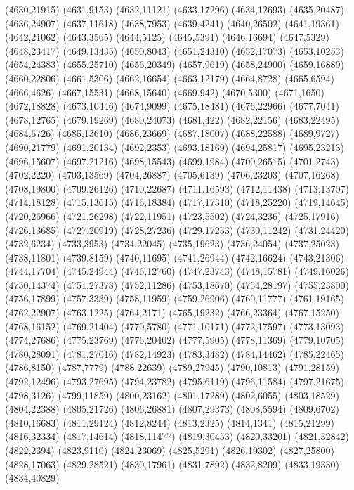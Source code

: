(4630,21915)
(4631,9153)
(4632,11121)
(4633,17296)
(4634,12693)
(4635,20487)
(4636,24907)
(4637,11618)
(4638,7953)
(4639,4241)
(4640,26502)
(4641,19361)
(4642,21062)
(4643,3565)
(4644,5125)
(4645,5391)
(4646,16694)
(4647,5329)
(4648,23417)
(4649,13435)
(4650,8043)
(4651,24310)
(4652,17073)
(4653,10253)
(4654,24383)
(4655,25710)
(4656,20349)
(4657,9619)
(4658,24900)
(4659,16889)
(4660,22806)
(4661,5306)
(4662,16654)
(4663,12179)
(4664,8728)
(4665,6594)
(4666,4626)
(4667,15531)
(4668,15640)
(4669,942)
(4670,5300)
(4671,1650)
(4672,18828)
(4673,10446)
(4674,9099)
(4675,18481)
(4676,22966)
(4677,7041)
(4678,12765)
(4679,19269)
(4680,24073)
(4681,422)
(4682,22156)
(4683,22495)
(4684,6726)
(4685,13610)
(4686,23669)
(4687,18007)
(4688,22588)
(4689,9727)
(4690,21779)
(4691,20134)
(4692,2353)
(4693,18169)
(4694,25817)
(4695,23213)
(4696,15607)
(4697,21216)
(4698,15543)
(4699,1984)
(4700,26515)
(4701,2743)
(4702,2220)
(4703,13569)
(4704,26887)
(4705,6139)
(4706,23203)
(4707,16268)
(4708,19800)
(4709,26126)
(4710,22687)
(4711,16593)
(4712,11438)
(4713,13707)
(4714,18128)
(4715,13615)
(4716,18384)
(4717,17310)
(4718,25220)
(4719,14645)
(4720,26966)
(4721,26298)
(4722,11951)
(4723,5502)
(4724,3236)
(4725,17916)
(4726,13685)
(4727,20919)
(4728,27236)
(4729,17253)
(4730,11242)
(4731,24420)
(4732,6234)
(4733,3953)
(4734,22045)
(4735,19623)
(4736,24054)
(4737,25023)
(4738,11801)
(4739,8159)
(4740,11695)
(4741,26944)
(4742,16624)
(4743,21306)
(4744,17704)
(4745,24944)
(4746,12760)
(4747,23743)
(4748,15781)
(4749,16026)
(4750,14374)
(4751,27378)
(4752,11286)
(4753,18670)
(4754,28197)
(4755,23800)
(4756,17899)
(4757,3339)
(4758,11959)
(4759,26906)
(4760,11777)
(4761,19165)
(4762,22907)
(4763,1225)
(4764,2171)
(4765,19232)
(4766,23364)
(4767,15250)
(4768,16152)
(4769,21404)
(4770,5780)
(4771,10171)
(4772,17597)
(4773,13093)
(4774,27686)
(4775,23769)
(4776,20402)
(4777,5905)
(4778,11369)
(4779,10705)
(4780,28091)
(4781,27016)
(4782,14923)
(4783,3482)
(4784,14462)
(4785,22465)
(4786,8150)
(4787,7779)
(4788,22639)
(4789,27945)
(4790,10813)
(4791,28159)
(4792,12496)
(4793,27695)
(4794,23782)
(4795,6119)
(4796,11584)
(4797,21675)
(4798,3126)
(4799,11859)
(4800,23162)
(4801,17289)
(4802,6055)
(4803,18529)
(4804,22388)
(4805,21726)
(4806,26881)
(4807,29373)
(4808,5594)
(4809,6702)
(4810,16683)
(4811,29124)
(4812,8244)
(4813,2325)
(4814,1341)
(4815,21299)
(4816,32334)
(4817,14614)
(4818,11477)
(4819,30453)
(4820,33201)
(4821,32842)
(4822,2394)
(4823,9110)
(4824,23069)
(4825,5291)
(4826,19302)
(4827,25800)
(4828,17063)
(4829,28521)
(4830,17961)
(4831,7892)
(4832,8209)
(4833,19330)
(4834,40829)
